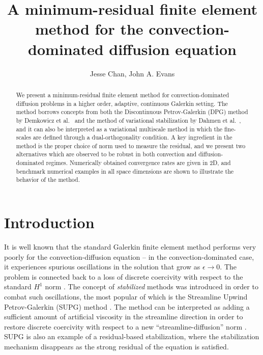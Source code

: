 \documentclass[final,leqno]{siamltex}
\title{A minimum-residual finite element method for the convection-dominated diffusion equation}
\author{Jesse Chan, John A. Evans}
\date{}
\begin{document}
\maketitle

\begin{abstract}
We present a minimum-residual finite element method for convection-dominated diffusion problems in a higher order, adaptive, continuous Galerkin setting.  The method borrows concepts from both the Discontinuous Petrov-Galerkin (DPG) method by Demkowicz et al.\ \cite{DPG2} and the method of variational stabilization by Dahmen et al.\ \cite{DahmenVariationalStabilization}, and it can also be interpreted as a variational multiscale method in which the fine-scales are defined through a dual-orthogonality condition.  A key ingredient in the method is the proper choice of norm used to measure the residual, and we present two alternatives which are observed to be robust in both convection and diffusion-dominated regimes.  Numerically obtained convergence rates are given in 2D, and benchmark numerical examples in all space dimensions are shown to illustrate the behavior of the method.
\end{abstract}


\section{Introduction}

It is well known that the standard Galerkin finite element method performs very poorly for the convection-diffusion equation -- in the convection-dominated case, it experiences spurious oscillations in the solution that grow as $\epsilon \rightarrow 0$.  The problem is connected back to a loss of discrete coercivity with respect to the standard $H^1$ norm \cite{roos2008robust}.  The concept of \textit{stabilized} methods was introduced in order to combat such oscillations, the most popular of which is the Streamline Upwind Petrov-Galerkin (SUPG) method \cite{SUPG}.  The method can be interpreted as adding a sufficient amount of artificial viscosity in the streamline direction in order to restore discrete coercivity with respect to a new ``streamline-diffusion'' norm \cite{johnsonCrosswind}.  SUPG is also an example of a residual-based stabilization, where the stabilization mechanism disappears as the strong residual of the equation is satisfied.  
\end{document}
